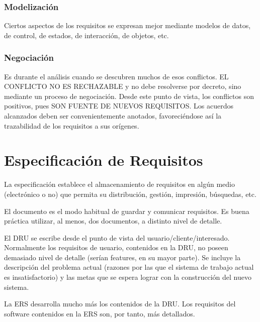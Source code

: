 \subsubsection{Modelización}
\label{sec:requisitos:analisis:modelizacion}

Ciertos aspectos de los requisitos se expresan mejor mediante modelos
de datos, de control, de estados, de interacción, de objetos, etc.

\subsubsection{Negociación}
\label{sec:requisitos:analisis:negociacion}

Es durante el análisis cuando se descubren muchos de esos
conflictos. EL CONFLICTO NO ES RECHAZABLE y no debe resolverse por
decreto, sino mediante un proceso de negociación. Desde este punto de
vista, los conflictos son positivos, pues SON FUENTE DE NUEVOS
REQUISITOS. Los acuerdos alcanzados deben ser convenientemente
anotados, favoreciéndose así la trazabilidad de los requisitos a sus
orígenes.

\section{Especificación de Requisitos}
\label{sec:requisitos:especificacion}

La especificación establece el almacenamiento de requisitos en algún
medio (electrónico o no) que permita su distribución, gestión,
impresión, búsquedas, etc.

El documento es el modo habitual de guardar y comunicar requisitos. Es
buena práctica utilizar, al menos, dos documentos, a distinto nivel de
detalle.

\begin{description}[noitemsep]
\item[DRU, Documento de Requisitos de Usuario (URD)] El DRU se escribe
  desde el punto de vista del usuario/cliente/interesado. Normalmente
  los requisitos de usuario, contenidos en la DRU, no poseen demasiado
  nivel de detalle (serían features, en su mayor parte). Se incluye la
  descripción del problema actual (razones por las que el sistema de
  trabajo actual es insatisfactorio) y las metas que se espera lograr
  con la construcción del nuevo sistema.
\item[ERS, Especificación de Requisitos de Software (SRS)] La ERS
  desarrolla mucho más los contenidos de la DRU. Los requisitos del
  software contenidos en la ERS son, por tanto, más detallados.
\end{description}

